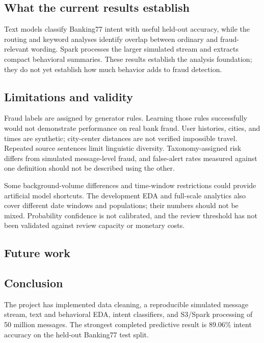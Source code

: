 \documentclass[
  english,
  11pt,
  letterpaper,
]{article}
\begin{document}
\subsection{What the current results
establish}\label{what-the-current-results-establish}

Text models classify Banking77 intent with useful held-out accuracy,
while the routing and keyword analyses identify overlap between ordinary
and fraud-relevant wording. Spark processes the larger simulated stream
and extracts compact behavioral summaries. These results establish the
analysis foundation; they do not yet establish how much behavior adds to
fraud detection.

\subsection{Limitations and validity}\label{limitations-and-validity}

Fraud labels are assigned by generator rules. Learning those rules
successfully would not demonstrate performance on real bank fraud. User
histories, cities, and times are synthetic; city-center distances are
not verified impossible travel. Repeated source sentences limit
linguistic diversity. Taxonomy-assigned risk differs from simulated
message-level fraud, and false-alert rates measured against one
definition should not be described using the other.

Some background-volume differences and time-window restrictions could
provide artificial model shortcuts. The development EDA and full-scale
analytics also cover different date windows and populations; their
numbers should not be mixed. Probability confidence is not calibrated,
and the review threshold has not been validated against review capacity
or monetary costs.

\subsection{Future work}\label{future-work}

\subsection{Conclusion}\label{conclusion}

The project has implemented data cleaning, a reproducible simulated
message stream, text and behavioral EDA, intent classifiers, and
S3/Spark processing of 50 million messages. The strongest completed
predictive result is 89.06\% intent accuracy on the held-out Banking77
test split.
\end{document}
